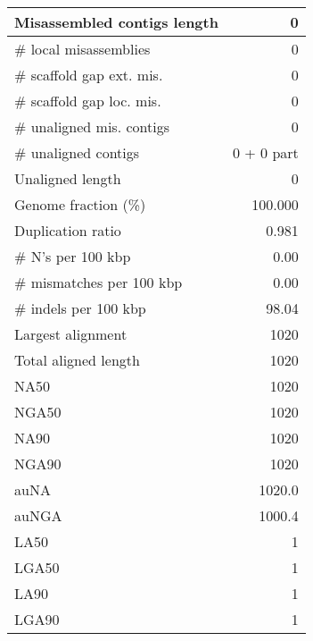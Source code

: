 \documentclass[12pt,a4paper]{article}
\begin{document}
\begin{table}[ht]
\begin{center}
\begin{tabular}{|l*{1}{|r}|}
Misassembled contigs length & 0 \\ \hline
\# local misassemblies & 0 \\ \hline
\# scaffold gap ext. mis. & 0 \\ \hline
\# scaffold gap loc. mis. & 0 \\ \hline
\# unaligned mis. contigs & 0 \\ \hline
\# unaligned contigs & 0 + 0 part \\ \hline
Unaligned length & 0 \\ \hline
Genome fraction (\%) & 100.000 \\ \hline
Duplication ratio & 0.981 \\ \hline
\# N's per 100 kbp & 0.00 \\ \hline
\# mismatches per 100 kbp & 0.00 \\ \hline
\# indels per 100 kbp & 98.04 \\ \hline
Largest alignment & 1020 \\ \hline
Total aligned length & 1020 \\ \hline
NA50 & 1020 \\ \hline
NGA50 & 1020 \\ \hline
NA90 & 1020 \\ \hline
NGA90 & 1020 \\ \hline
auNA & 1020.0 \\ \hline
auNGA & 1000.4 \\ \hline
LA50 & 1 \\ \hline
LGA50 & 1 \\ \hline
LA90 & 1 \\ \hline
LGA90 & 1 \\ \hline
\end{tabular}
\end{center}
\end{table}
\end{document}
